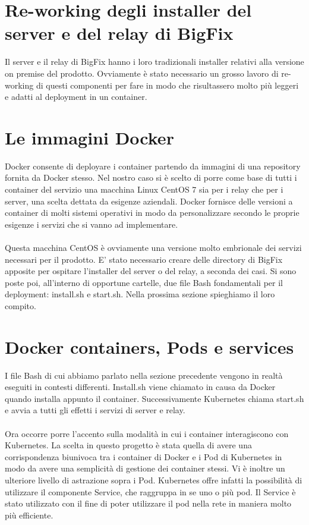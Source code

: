 \section{Re-working degli installer del server e del relay di BigFix}
Il server e il relay di BigFix hanno i loro tradizionali installer relativi alla versione on premise del prodotto. Ovviamente è stato necessario un grosso lavoro di re-working di questi componenti per fare in modo che risultassero molto più leggeri e adatti al deployment in un container.

\section{Le immagini Docker}
Docker consente di deployare i container partendo da immagini di una repository fornita da Docker stesso. Nel nostro caso si è scelto di porre come base di tutti i container del servizio una macchina Linux CentOS 7 sia per i relay che per i server, una scelta dettata da esigenze aziendali. Docker fornisce delle versioni a container di molti sistemi operativi in modo da personalizzare secondo le proprie esigenze i servizi che si vanno ad implementare.

\paragraph{}
Questa macchina CentOS è ovviamente una versione molto embrionale dei servizi necessari per il prodotto. E' stato necessario creare delle directory di BigFix apposite per ospitare l'installer del server o del relay, a seconda dei casi. Si sono poste poi, all'interno di opportune cartelle, due file Bash fondamentali per il deployment: install.sh e start.sh. Nella prossima sezione spieghiamo il loro compito.

\section{Docker containers, Pods e services}
I file Bash di cui abbiamo parlato nella sezione precedente vengono in realtà eseguiti in contesti differenti. Install.sh viene chiamato in causa da Docker quando installa appunto il container. Successivamente Kubernetes chiama start.sh e avvia a tutti gli effetti i servizi di server e relay.
\paragraph{}
Ora occorre porre l'accento sulla modalità in cui i container interagiscono con Kubernetes. La scelta in questo progetto è stata quella di avere una corrispondenza biunivoca tra i container di Docker e i Pod di Kubernetes in modo da avere una semplicità di gestione dei container stessi. Vi è inoltre un ulteriore livello di astrazione sopra i Pod. Kubernetes offre infatti la possibilità di utilizzare il componente Service, che raggruppa in se uno o più pod. Il Service è stato utilizzato con il fine di poter utilizzare il pod nella rete in maniera molto più efficiente.
